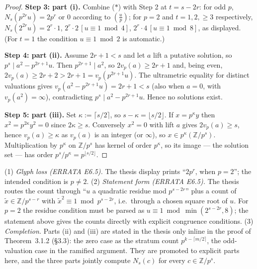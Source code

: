 \begin{proof}
  \textbf{Step 3: part (i).} Combine ($*$) with Step 2 at $t = s - 2r$:
  for odd $p$, $N_s(p^{2r}u) = 2p^{r}$ or $0$ according to
  $\left(\frac{u}{p}\right)$; for $p = 2$ and $t = 1, 2, {\geq}3$ respectively,
  $N_s(2^{2r}u) = 2^{r}\cdot 1$, $2^{r}\cdot 2\,[u \equiv 1 \bmod 4]$,
  $2^{r}\cdot 4\,[u \equiv 1 \bmod 8]$, as displayed. (For $t = 1$ the condition
  $u \equiv 1 \bmod 2$ is automatic.)

  \textbf{Step 4: part (ii).} Assume $2r+1 < s$ and let $a$ lift a putative
  solution, so $p^{s} \mid a^2 - p^{2r+1}u$. Then
  $p^{2r+1} \mid a^2$, so $2v_p(a) \geq 2r+1$ and, being even,
  $2v_p(a) \geq 2r+2 > 2r+1 = v_p(p^{2r+1}u)$. The ultrametric equality for
  distinct valuations gives $v_p(a^2 - p^{2r+1}u) = 2r+1 < s$ (also when
  $a = 0$, with $v_p(a^2) = \infty$), contradicting
  $p^{s} \mid a^2 - p^{2r+1}u$. Hence no solutions exist.

  \textbf{Step 5: part (iii).} Set $\kappa := \lceil s/2 \rceil$, so
  $s - \kappa = \lfloor s/2 \rfloor$. If $x = p^{\kappa}y$ then
  $x^2 = p^{2\kappa}y^2 = 0$ since $2\kappa \geq s$. Conversely $x^2 = 0$ with
  lift $a$ gives $2v_p(a) \geq s$, hence $v_p(a) \geq \kappa$ as $v_p(a)$ is an
  integer (or $\infty$), so $x \in p^{\kappa}(\mathbb{Z}/p^{s})$. Multiplication
  by $p^{\kappa}$ on $\mathbb{Z}/p^{s}$ has kernel of order $p^{\kappa}$, so its
  image — the solution set — has order $p^{s}/p^{\kappa} = p^{\lfloor s/2\rfloor}$.
\end{proof}

\begin{remark}\label{lem-3-2-6-divergence}
  (1) \emph{Glyph loss (ERRATA E6.5).} The thesis display prints
  ``$2p^{r}$, when $p = 2$''; the intended condition is $p \neq 2$.
  (2) \emph{Statement form (ERRATA E6.5).} The thesis routes the count through
  ``$u$ a quadratic residue mod $p^{s-2r}$'' plus a count of
  $\tilde{x} \in \mathbb{Z}/p^{s-r}$ with $\tilde{x}^2 \equiv 1 \bmod p^{s-2r}$,
  i.e.\ through a chosen square root of $u$. For $p = 2$ the residue condition
  must be parsed as $u \equiv 1 \bmod \min(2^{s-2r}, 8)$; the statement above
  gives the counts directly with explicit congruence conditions.
  (3) \emph{Completion.} Parts (ii) and (iii) are stated in the thesis only
  inline in the proof of Theorem~3.1.2 (\S 3.3): the zero case as the stratum
  count $p^{k - \lceil m/2\rceil}$, the odd-valuation case in the ramified
  argument. They are promoted to explicit parts here, and the three parts
  jointly compute $N_s(c)$ for every $c \in \mathbb{Z}/p^{s}$.
\end{remark}


